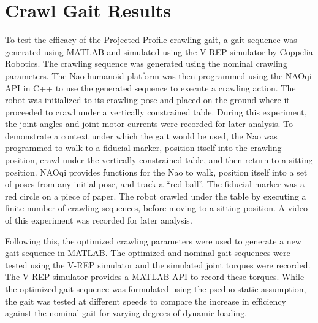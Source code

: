 \chapter{Crawl Gait Results} \label{ch:results_crawl_gait}


To test the efficacy of the Projected Profile crawling gait, a gait sequence was generated
using MATLAB and simulated using the V-REP simulator by Coppelia Robotics.
The crawling sequence was generated using the nominal crawling parameters. 
The Nao humanoid platform was then programmed using the NAOqi API in C++ to use the generated sequence 
to execute a crawling action. The robot was initialized to its crawling pose and placed on the 
ground where it proceeded to crawl under a vertically constrained table. 
During this experiment, the joint angles and joint motor 
currents were recorded for later analysis.
To demonstrate a context under which the gait 
would be used, the Nao was programmed to walk to a fiducial marker, position itself into
the crawling position, crawl under the vertically constrained table, and then return to a sitting position.
NAOqi provides functions for the Nao to walk, position itself into a set of poses from any initial
pose, and track a ``red ball''. The fiducial marker was a red circle on a piece of paper.
The robot crawled under the table by executing a finite number of crawling sequences, before
moving to a sitting position. A video of this experiment was recorded for later analysis.

Following this, the optimized crawling parameters were used to generate a new gait sequence in
MATLAB\@. The optimized and nominal gait sequences were tested using the V-REP simulator and the simulated
joint torques were recorded. The V-REP simulator provides a MATLAB API to record these torques.
While the optimized gait sequence was formulated using the pseduo-static assumption,
the gait was tested at different speeds to compare the increase in efficiency against the nominal
gait for varying degrees of dynamic loading.

